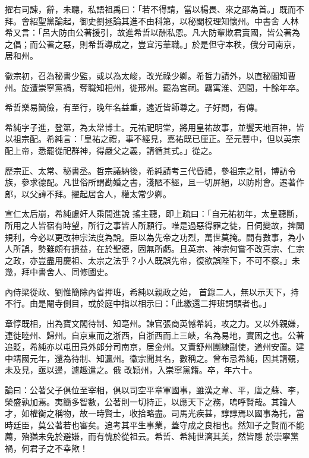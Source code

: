\begin{pinyinscope}
 擢右司諫，辭，未聽，私語祖禹曰：「若不得請，當以楊畏、來之邵為首。」既而不拜。會紹聖黨論起，御史劉拯論其進不由科第，以秘閣校理知懷州。中書舍
 人林希又言：「呂大防由公著援引，故進希哲以酬私恩。凡大防輩欺君賣國，皆公著為之倡；而公著之惡，則希哲導成之，豈宜污華職。」於是但守本秩，俄分司南京，居和州。



 徽宗初，召為秘書少監，或以為太峻，改光祿少卿。希哲力請外，以直秘閣知曹州。旋遭崇寧黨禍，奪職知相州，徙邢州。罷為宮祠。羈寓淮、泗間，十餘年卒。



 希哲樂易簡儉，有至行，晚年名益重，遠近皆師尊之。子好問，有傳。



 希純字子進，登第，為太常博士。元祐祀明堂，將用皇祐故事，並饗天地百神，皆以祖宗配。希純言：「皇祐之禮，事不經見，嘉祐既已厘正。至元豐中，但以英宗配上帝，悉罷從祀群神，得嚴父之義，請循其式。」從之。



 歷宗正、太常、秘書丞。哲宗議納後，希純請考三代昏禮，參祖宗之制，博訪令族，參求德配。凡世俗所謂勘婚之書，淺陋不經，且一切屏絕，以防附會。遷著作郎，以父諱不拜。擢起居舍人，權太常少卿。



 宣仁太后崩，希純慮奸人乘間進說
 搖主聽，即上疏曰：「自元祐初年，太皇聽斷，所用之人皆宿有時望，所行之事皆人所願行。唯是過惡得罪之徒，日伺變故，捭闔規利，今必以更改神宗法度為說。臣以為先帝之功烈，萬世莫掩。間有數事，為小人所誤，勢雖頗有損益，在於聖德，固無所虧。且英宗、神宗何嘗不改真宗、仁宗之政，亦豈盡用慶祖、太宗之法乎？小人既誤先帝，復欲誤陛下，不可不察。」未幾，拜中書舍人、同修國史。



 內侍梁從政、劉惟簡除內省押班，希純以親政之始，
 首錄二人，無以示天下，持不行。由是閹寺側目，或於庭中指以相示曰：「此繳還二押班詞頭者也。」



 章惇既相，出為寶文閣待制、知亳州。諫官張商英憾希純，攻之力。又以外親嫌，連徙睦州、歸州。自京東而之浙西，自浙西而上三峽，名為易地，實困之也。公著追貶，希純亦以屯田員外郎分司南京，居金州。又責舒州團練副使，道州安置。建中靖國元年，還為待制、知瀛州。徽宗聞其名，數稱之。曾布忌希純，因其請覲，未及見，亟以邊，遽趣遣之。俄
 改穎州，入崇寧黨籍。卒，年六十。



 論曰：公著父子俱位至宰相，俱以司空平章軍國事，雖漢之韋、平，唐之蘇、李，榮盛孰加焉。夷簡多智數，公著則一切持正，以應天下之務，嗚呼賢哉。其論人才，如權衡之稱物，故一時賢士，收拾略盡。司馬光疾甚，諄諄焉以國事為托，當時廷臣，莫公著若也審矣。追考其平生事業，蓋守成之良相也。然知子之賢而不能薦，殆猶未免於避嫌，而有愧於從祖云。希哲、希純世濟其美，然皆隱
 於崇寧黨禍，何君子之不幸歟！



\end{pinyinscope}